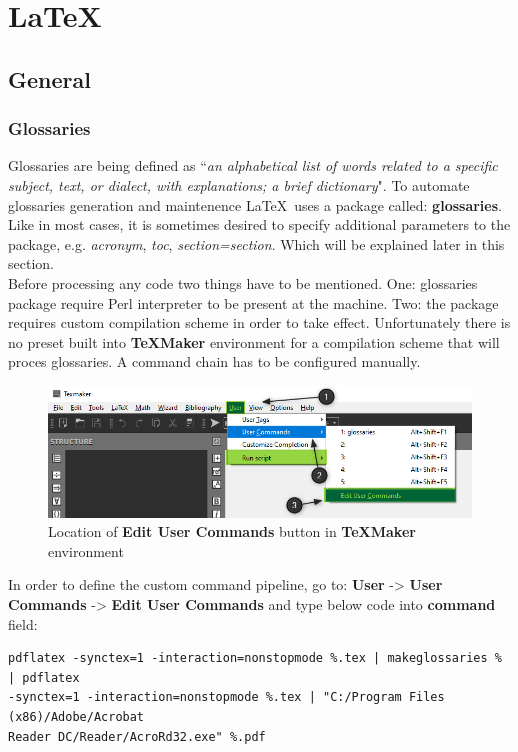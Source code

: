 \part{\LaTeX}

\chapter{General}

\section{Glossaries}

Glossaries are being defined as ``\textit{an alphabetical list of words related to a specific subject, text, or dialect, with explanations; a brief dictionary}". To automate glossaries generation and maintenence \LaTeX\ uses a package called: \textbf{glossaries}. Like in most cases, it is sometimes desired to specify additional parameters to the package, e.g. \textit{acronym}, \textit{toc}, \textit{section=section}. Which will be explained later in this section.\\

Before processing any code two things have to be mentioned. One: glossaries package require Perl interpreter to be present at the machine. Two: the package requires custom compilation scheme in order to take effect. Unfortunately there is no preset built into \textbf{TeXMaker} environment for a compilation scheme that will proces glossaries. A command chain has to be configured manually.

\begin{figure}[H]
\centering
\includegraphics[scale=0.6]{content/LaTeX/figures/user_command_glossaries_marked.png}
\caption{Location of \textbf{Edit User Commands} button in \textbf{TeXMaker} environment}
\end{figure}

In order to define the custom command pipeline, go to: \textbf{User} -> \textbf{User Commands} -> \textbf{Edit User Commands} and type below code into \textbf{command} field:
\begin{verbatim}
pdflatex -synctex=1 -interaction=nonstopmode %.tex | makeglossaries % | pdflatex 
-synctex=1 -interaction=nonstopmode %.tex | "C:/Program Files (x86)/Adobe/Acrobat
Reader DC/Reader/AcroRd32.exe" %.pdf
\end{verbatim}

